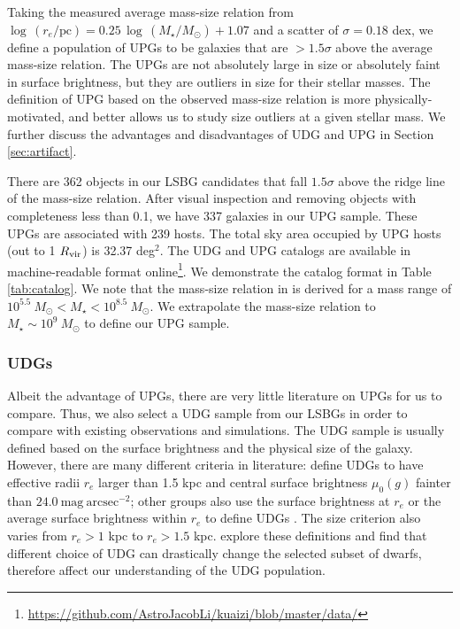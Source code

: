 \documentclass[twocolumn,astrosymb,twocolappendix]{aastex631}
\newcommand{\sbunit}{\mathrm{mag\ arcsec}^{-2}}
\begin{document}
\begin{CJK*}{UTF8}{gbsn}
Taking the measured average mass-size relation from \citet{ELVES-I} $\log\, (r_e/\mathrm{pc}) = 0.25\, \log\, (M_\star/M_\odot) + 1.07$ and a scatter of $\sigma=0.18$ dex, we define a population of UPGs to be galaxies that are $>1.5\sigma$ above the average mass-size relation. The UPGs are not absolutely large in size or absolutely faint in surface brightness, but they are outliers in size for their stellar masses. The definition of UPG based on the observed mass-size relation is more physically-motivated, and better allows us to study size outliers at a given stellar mass. We further discuss the advantages and disadvantages of UDG and UPG in Section \ref{sec:artifact}.

There are 362 objects in our LSBG candidates that fall $1.5\sigma$ above the ridge line of the mass-size relation. After visual inspection and removing objects with completeness less than 0.1, we have 337 galaxies in our UPG sample. These UPGs are associated with 239 hosts. The total sky area occupied by UPG hosts (out to 1 $R_{\rm{vir}}$) is 32.37 deg$^{2}$. The UDG and UPG catalogs are available in machine-readable format online\footnote{\url{https://github.com/AstroJacobLi/kuaizi/blob/master/data/}}. We demonstrate the catalog format in Table \ref{tab:catalog}. We note that the mass-size relation in \citet{ELVES-I} is derived for a mass range of $10^{5.5}\ M_\odot < M_\star < 10^{8.5}\ M_\odot$. We extrapolate the mass-size relation to $M_\star \sim 10^9\ M_\odot$ to define our UPG sample. 

\subsubsection{UDGs}
Albeit the advantage of UPGs, there are very little literature on UPGs for us to compare. Thus, we also select a UDG sample from our LSBGs in order to compare with existing observations and simulations. The UDG sample is usually defined based on the surface brightness and the physical size of the galaxy. However, there are many different criteria in literature: \citep{vanDokkum2015} define UDGs to have effective radii $r_e$ larger than 1.5 kpc and central surface brightness $\mu_0(g)$ fainter than $24.0\ \sbunit$; other groups also use the surface brightness at $r_e$ \citep[e.g.,][]{DiCintio2017,Cardona-Barrero2020} or the average surface brightness within $r_e$ to define UDGs \citep[e.g.,][]{Koda2015,Yagi2016,vdBurg2016,Leisman2017,Martin2019}. The size criterion also varies from $r_e > 1$ kpc to $r_e > 1.5$ kpc. \citet{vanNest2022} explore these definitions and find that different choice of UDG can drastically change the selected subset of dwarfs, therefore affect our understanding of the UDG population.


\end{CJK*}
\end{document}
